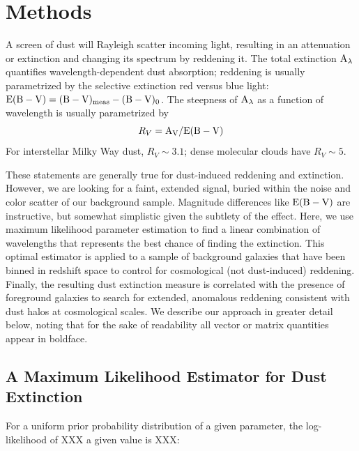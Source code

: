 \documentclass[11pt, oneside]{article}   	%
\begin{document}
\section{Methods\label{sec:methods}}

A screen of dust will Rayleigh scatter incoming light, resulting in an attenuation or extinction and changing its spectrum by reddening it. The total extinction $\rm A_\lambda$ quantifies wavelength-dependent dust absorption; reddening is usually parametrized by the selective extinction red versus blue light: $\rm  E(B-V) = (B-V)_{\rm meas} - (B-V)_0$. %
The steepness of $\rm A_\lambda$ as a function of wavelength is usually parametrized by 
\begin{equation}
R_V = \rm{A_V / E(B - V)}
\end{equation}
For interstellar Milky Way dust, $R_V \sim 3.1$; dense molecular clouds have $R_V \sim 5$. 

These statements are generally true for dust-induced reddening and extinction. However, we are looking for a faint, extended signal, buried within the noise and color scatter of our background sample. Magnitude differences like $\rm E(B - V)$ are instructive, but somewhat simplistic given the subtlety of the effect. Here, we use maximum likelihood parameter estimation to find a linear combination of wavelengths that represents the best chance of finding the extinction. This optimal estimator is applied to a sample of background galaxies that have been binned in redshift space to control for cosmological (not dust-induced) reddening. Finally, the resulting dust extinction measure is correlated with the presence of foreground galaxies to search for extended, anomalous reddening consistent with dust halos at cosmological scales. We describe our approach in greater detail below, noting that for the sake of readability all vector or matrix quantities appear in boldface. 

\subsection{A Maximum Likelihood Estimator for Dust Extinction}\label{ssec:estimator}

For a uniform prior probability distribution of a given parameter, the log-likelihood of XXX a given value is XXX:
\end{document}
